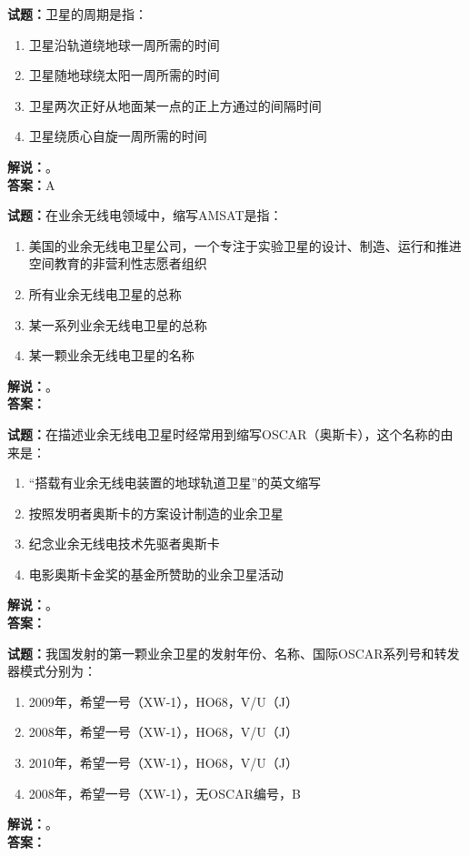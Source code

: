 \documentclass{ctexbook}
\begin{document}
\vspace{\baselineskip}

\noindent\textbf{试题：}卫星的周期是指：
\begin{enumerate}[leftmargin=3em]
  \item 卫星沿轨道绕地球一周所需的时间
  \item 卫星随地球绕太阳一周所需的时间
  \item 卫星两次正好从地面某一点的正上方通过的间隔时间
  \item 卫星绕质心自旋一周所需的时间
\end{enumerate}
\noindent\textbf{解说：}。\\\noindent\textbf{答案：}A

\vspace{\baselineskip}

\noindent\textbf{试题：}在业余无线电领域中，缩写AMSAT是指：
\begin{enumerate}[leftmargin=3em]
  \item 美国的业余无线电卫星公司，一个专注于实验卫星的设计、制造、运行和推进空间教育的非营利性志愿者组织
  \item 所有业余无线电卫星的总称
  \item 某一系列业余无线电卫星的总称
  \item 某一颗业余无线电卫星的名称
\end{enumerate}
\noindent\textbf{解说：}\textbf{}。\\\noindent\textbf{答案：}

\vspace{\baselineskip}

\noindent\textbf{试题：}在描述业余无线电卫星时经常用到缩写OSCAR（奥斯卡），这个名称的由来是：
\begin{enumerate}[leftmargin=3em]
  \item “搭载有业余无线电装置的地球轨道卫星”的英文缩写
  \item 按照发明者奥斯卡的方案设计制造的业余卫星
  \item 纪念业余无线电技术先驱者奥斯卡
  \item 电影奥斯卡金奖的基金所赞助的业余卫星活动
\end{enumerate}
\noindent\textbf{解说：}\textbf{}。\\\noindent\textbf{答案：}

\vspace{\baselineskip}

\noindent\textbf{试题：}我国发射的第一颗业余卫星的发射年份、名称、国际OSCAR系列号和转发器模式分别为：
\begin{enumerate}[leftmargin=3em]
  \item 2009年，希望一号（XW-1），HO68，V/U（J）
  \item 2008年，希望一号（XW-1），HO68，V/U（J）
  \item 2010年，希望一号（XW-1），HO68，V/U（J）
  \item 2008年，希望一号（XW-1），无OSCAR编号，B
\end{enumerate}
\noindent\textbf{解说：}\textbf{}。\\\noindent\textbf{答案：}
\end{document}
